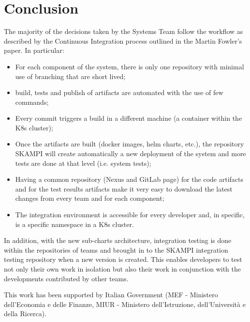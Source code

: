 \documentclass[a4paper]{spie}  %
\begin{document}
\section{Conclusion}
The majority of the decisions taken by the Systems Team follow the workflow as described by the Continuous Integration process outlined in the Martin Fowler’s paper. In particular:
\begin{itemize}
    \item For each component of the system, there is only one repository with minimal use of branching that are short lived;
    \item build, tests and publish of artifacts are automated with the use of few commands;
    \item Every commit triggers a build in a different machine (a container within the K8s cluster);
    \item Once the artifacts are built (docker images, helm charts, etc.), the repository SKAMPI will create automatically a new deployment of the system and more tests are done at that level (i.e. system tests);
    \item Having a common repository (Nexus and GitLab page) for the code artifacts and for the test results artifacts make it very easy to download the latest changes from every team and for each component;
    \item The integration environment is accessible for every developer and, in specific, is a specific namespace in a K8s cluster.
\end{itemize}

In addition, with the new sub-charts architecture, integration testing is done within the repositories of teams and brought in to the SKAMPI integration testing repository when a new version is created.  This enables developers to test not only their own work in isolation but also their work in conjunction with the developments contributed by other teams.

\acknowledgments %

This work has been supported by Italian Government (MEF - Ministero dell'Economia e delle Finanze, MIUR - Ministero dell'Istruzione, dell'Università e della Ricerca).

\end{document}
